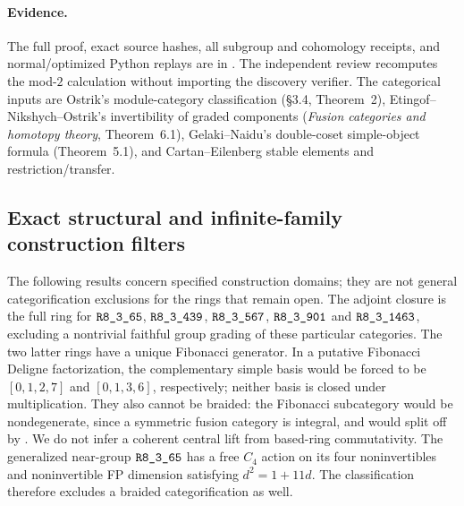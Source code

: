 \paragraph{Evidence.}
The full proof, exact source hashes, all subgroup and cohomology
receipts, and normal/optimized Python replays are in
.
The independent review recomputes the mod-$2$ calculation without
importing the discovery verifier. The categorical inputs are Ostrik's
module-category classification (\S3.4, Theorem~2),
Etingof--Nikshych--Ostrik's invertibility of graded components
(\emph{Fusion categories and homotopy theory}, Theorem~6.1),
Gelaki--Naidu's double-coset simple-object formula (Theorem~5.1),
and Cartan--Eilenberg stable elements and restriction/transfer.

\subsection{Exact structural and infinite-family construction filters}
The following results concern specified construction domains; they are not
general categorification exclusions for the rings that remain open.
The adjoint closure is the full ring for
$\sha{R8_3_65}$, $\sha{R8_3_439}$, $\sha{R8_3_567}$,
$\sha{R8_3_901}$ and $\sha{R8_3_1463}$, excluding a nontrivial faithful group
grading of these particular categories. The two latter rings have a unique
Fibonacci generator. In a putative Fibonacci Deligne factorization, the
complementary simple basis would be forced to be $[0,1,2,7]$ and
$[0,1,3,6]$, respectively; neither basis is closed under multiplication.
They also cannot be braided: the Fibonacci subcategory would be
nondegenerate, since a symmetric fusion category is integral, and would
split off by \cite[Corollary~2.46 and Theorem~3.13]{DGNO}.
We do not infer a coherent central lift from based-ring commutativity.
The generalized near-group $\sha{R8_3_65}$ has a free $C_4$ action on its four
noninvertibles and noninvertible FP dimension satisfying $d^2=1+11d$.
The classification \cite[Theorem~1]{SchopierayBraidedGNG} therefore excludes
a braided categorification as well.

